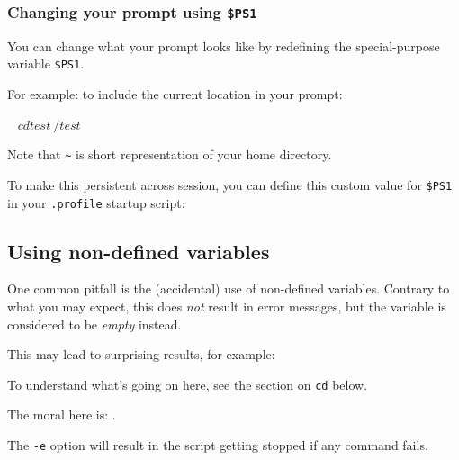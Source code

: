 \subsubsection{Changing your prompt using \texttt{\$PS1}}

You can change what your prompt looks like by redefining the special-purpose
variable \lstinline|$PS1|.

For example: to include the current location in your prompt:

\begin{prompt}
~ $ cd test
~/test $
\end{prompt}

Note that \lstinline|~| is short representation of your home directory.

To make this persistent across session, you can define this custom value for
\lstinline|$PS1| in your \lstinline|.profile| startup script:

\begin{prompt}
\end{prompt}

\subsection{Using non-defined variables}

One common pitfall is the (accidental) use of non-defined variables.  Contrary
to what you may expect, this does \emph{not} result in error messages, but the
variable is considered to be \emph{empty} instead.

This may lead to surprising results, for example:

\begin{prompt}
\end{prompt}

To understand what's going on here, see the section on \lstinline|cd| below.

The moral here is: .


The \lstinline|-e| option will result in the script getting stopped if any command fails.

